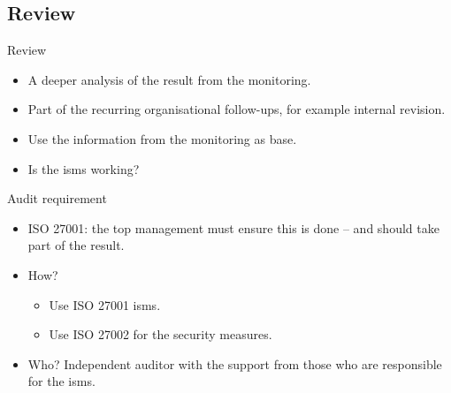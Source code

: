 \documentclass{beamer}
\begin{document}
\subsection{Review}
\begin{frame}{Review}
  \begin{itemize}
    \item A deeper analysis of the result from the monitoring.
    \item Part of the recurring organisational follow-ups, for example internal
      revision.
    \item Use the information from the monitoring as base.
    \item Is the \ac{isms} working\@?
  \end{itemize}
\end{frame}
\begin{frame}{Audit requirement}
  \begin{itemize}
    \item ISO 27001: the top management must ensure this is done -- and should
      take part of the result.
    \item How?
      \begin{itemize}
        \item Use ISO 27001 \ac{isms}\@.
        \item Use ISO 27002 for the security measures.
      \end{itemize}
    \item Who?
      Independent auditor with the support from those who are responsible for
      the \ac{isms}.
  \end{itemize}
\end{frame}
\end{document}
